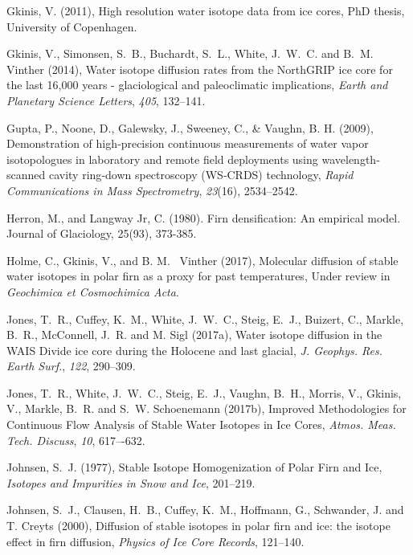 \documentclass[draft, jgrga]{AGUTeX}
\begin{document}
\begin{article}
\begin{thebibliography}{}
Gkinis, V. (2011),
{ High resolution water isotope data from ice cores},
PhD thesis, University of Copenhagen.

Gkinis, V., Simonsen, S.~B., Buchardt, S.~L., White, J.~W.~C. and  B.~M. Vinther (2014),
{Water isotope diffusion rates from the NorthGRIP ice core for the last 16,000 years - glaciological and paleoclimatic implications},
\textit{Earth and Planetary Science Letters}, \textit{405}, 132--141.

Gupta, P., Noone, D., Galewsky, J., Sweeney, C., \& Vaughn, B. H. (2009),
{Demonstration of high‐precision continuous measurements of water vapor isotopologues in laboratory and remote field deployments using wavelength‐scanned cavity ring‐down spectroscopy (WS‐CRDS) technology},
\textit{Rapid Communications in Mass Spectrometry}, \textit{23}(16), 2534--2542.

Herron, M., and Langway Jr, C. (1980). Firn densification: An empirical model. Journal of Glaciology, 25(93), 373-385.

Holme, C., Gkinis, V., and B. M. ~Vinther (2017), Molecular
diffusion of stable water isotopes in polar firn as a proxy
for past temperatures, Under review in \textit{Geochimica et Cosmochimica Acta}.

Jones, T.~R., Cuffey, K.~M., White, J.~W.~C., Steig, E.~J., Buizert, C.,
Markle, B.~R., McConnell, J.~R. and M. Sigl (2017a),
{Water isotope diffusion in the WAIS Divide ice core
	during the Holocene and last glacial},
\textit{J. Geophys. Res. Earth Surf.}, \textit{122}, 290–309.

Jones, T.~R., White, J.~W.~C., Steig, E.~J., Vaughn, B.~H., Morris, V.,
Gkinis, V., Markle, B.~R. and S.~W. Schoenemann (2017b),
{Improved Methodologies for Continuous Flow Analysis of Stable
Water Isotopes in Ice Cores},
\textit{Atmos. Meas. Tech. Discuss}, \textit{10}, 617–-632.

Johnsen, S.~J. (1977),
{Stable Isotope Homogenization of Polar Firn and Ice},
\textit{Isotopes and Impurities in Snow and Ice}, 201--219.

Johnsen, S.~J., Clausen, H.~B., Cuffey, K.~M., Hoffmann, G., Schwander, J. and T. Creyts (2000),
{Diffusion of stable isotopes in polar firn and ice: the isotope effect in firn diffusion},
\textit{Physics of Ice Core Records}, 121--140.


\end{thebibliography}
\end{article}
\end{document}
